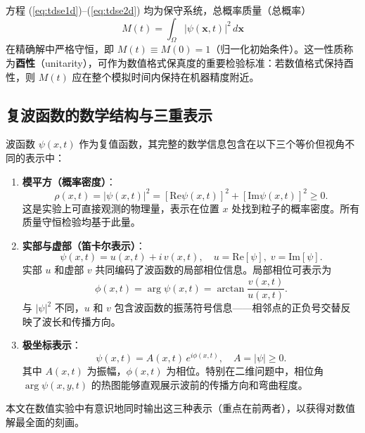 \documentclass[12pt,a4paper]{article}
\begin{document}
方程 (\ref{eq:tdse1d})--(\ref{eq:tdse2d}) 均为保守系统，总概率质量（总概率）
\begin{equation}\label{eq:mass}
    M(t) = \int_\Omega |\psi(\mathbf{x},t)|^2 \, d\mathbf{x}
\end{equation}
在精确解中严格守恒，即 $M(t) \equiv M(0) = 1$（归一化初始条件）。这一性质称为\textbf{酉性}（unitarity），可作为数值格式保真度的重要检验标准：若数值格式保持酉性，则 $M(t)$ 应在整个模拟时间内保持在机器精度附近。

\subsection{复波函数的数学结构与三重表示}

波函数 $\psi(x,t)$ 作为复值函数，其完整的数学信息包含在以下三个等价但视角不同的表示中：

\begin{enumerate}
    \item \textbf{模平方（概率密度）}：
    \begin{equation}
        \rho(x,t) = |\psi(x,t)|^2 = [\mathrm{Re}\psi(x,t)]^2 + [\mathrm{Im}\psi(x,t)]^2 \geq 0.
    \end{equation}
    这是实验上可直接观测的物理量，表示在位置 $x$ 处找到粒子的概率密度。所有质量守恒检验均基于此量。

    \item \textbf{实部与虚部（笛卡尔表示）}：
    \begin{equation}
        \psi(x,t) = u(x,t) + i\, v(x,t), \quad u = \mathrm{Re}[\psi], \; v = \mathrm{Im}[\psi].
    \end{equation}
    实部 $u$ 和虚部 $v$ 共同编码了波函数的局部相位信息。局部相位可表示为
    \begin{equation}
        \phi(x,t) = \arg\psi(x,t) = \arctan\frac{v(x,t)}{u(x,t)}.
    \end{equation}
    与 $|\psi|^2$ 不同，$u$ 和 $v$ 包含波函数的振荡符号信息——相邻点的正负号交替反映了波长和传播方向。

    \item \textbf{极坐标表示}：
    \begin{equation}
        \psi(x,t) = A(x,t)\, e^{i\phi(x,t)}, \quad A = |\psi| \geq 0.
    \end{equation}
    其中 $A(x,t)$ 为振幅，$\phi(x,t)$ 为相位。特别在二维问题中，相位角 $\arg\psi(x,y,t)$ 的热图能够直观展示波前的传播方向和弯曲程度。
\end{enumerate}

本文在数值实验中有意识地同时输出这三种表示（重点在前两者），以获得对数值解最全面的刻画。
\end{document}
